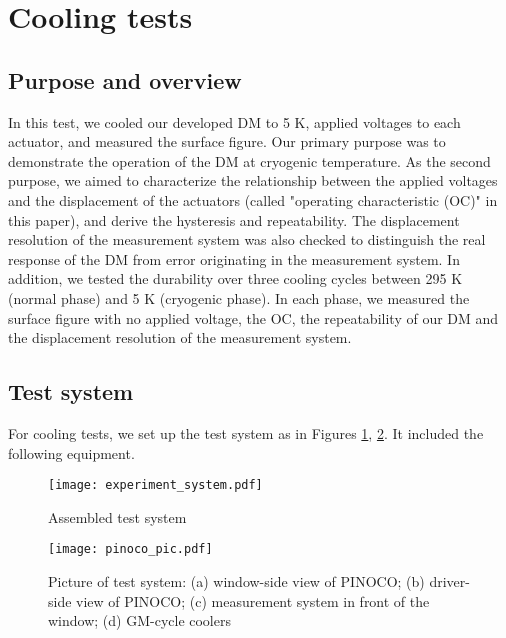 \documentclass[a4paper]{article}
\begin{document}
\section{Cooling tests}
\label{Cooling tests}

\subsection{Purpose and overview}
In this test, we cooled our developed DM to 5 K, applied voltages to each actuator, and measured the surface figure. Our primary purpose was to demonstrate the operation of the DM at cryogenic temperature. As the second purpose, we aimed to characterize the relationship between the applied voltages and the displacement of the actuators (called "operating characteristic (OC)" in this paper), and derive the hysteresis and repeatability. The displacement resolution of the measurement system was also checked to distinguish the real response of the DM from error originating in the measurement system. In addition, we tested the durability over three cooling cycles between 295 K (normal phase) and 5 K (cryogenic phase).  In each phase, we measured the surface figure with no applied voltage, the OC, the repeatability of our DM and the displacement resolution of the measurement system.

\subsection{Test system}
For cooling tests, we set up the test system as in Figures \ref{experiment_system}, \ref{pinoco_pic}.
It included the following equipment. 

\begin{figure}[tb]
\centering
\texttt{[image: experiment\_system.pdf]}
\caption{Assembled test system}
\label{experiment_system}
\end{figure}

\begin{figure}[tb]
\centering
\texttt{[image: pinoco\_pic.pdf]}
\caption{Picture of test system: (a) window-side view of PINOCO; (b) driver-side view of PINOCO; (c) measurement system in front of the window; (d) GM-cycle coolers}
\label{pinoco_pic}
\end{figure}
\end{document}

